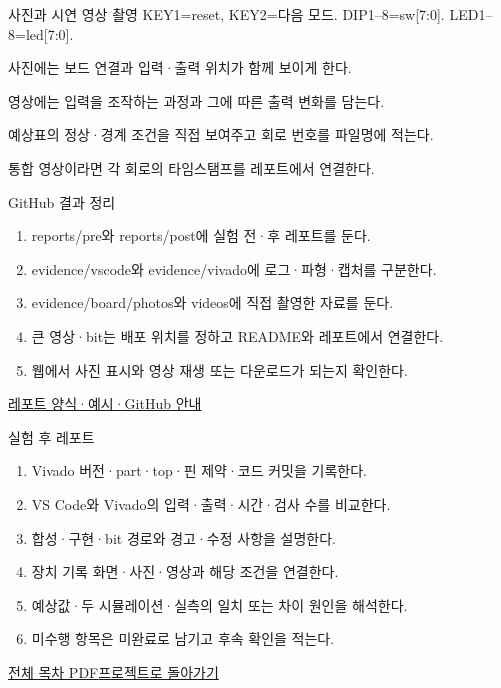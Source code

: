 \begin{frame}{사진과 시연 영상 촬영}\relax
\small
KEY1=reset, KEY2=다음 모드. DIP1–8=sw[7:0]. LED1–8=led[7:0].\par\vspace{0.22cm}사진에는 보드 연결과 입력·출력 위치가 함께 보이게 한다.\par\vspace{0.22cm}영상에는 입력을 조작하는 과정과 그에 따른 출력 변화를 담는다.\par\vspace{0.22cm}예상표의 정상·경계 조건을 직접 보여주고 회로 번호를 파일명에 적는다.\par\vspace{0.22cm}통합 영상이라면 각 회로의 타임스탬프를 레포트에서 연결한다.\par
\end{frame}

\begin{frame}{GitHub 결과 정리}\relax
\small
\begin{enumerate}\setlength{\itemsep}{0.22cm}
\item reports/pre와 reports/post에 실험 전·후 레포트를 둔다.
\item evidence/vscode와 evidence/vivado에 로그·파형·캡처를 구분한다.
\item evidence/board/photos와 videos에 직접 촬영한 자료를 둔다.
\item 큰 영상·bit는 배포 위치를 정하고 README와 레포트에서 연결한다.
\item 웹에서 사진 표시와 영상 재생 또는 다운로드가 되는지 확인한다.
\end{enumerate}
\href{https://github.com/Glaysia/ece2_26_2_2/blob/daily/0910/example/fpga_projects_hdl/LAB1/docs/reports.md}{레포트 양식·예시·GitHub 안내}
\end{frame}

\begin{frame}{실험 후 레포트}\relax
\small
\begin{enumerate}\setlength{\itemsep}{0.22cm}
\item Vivado 버전·part·top·핀 제약·코드 커밋을 기록한다.
\item VS Code와 Vivado의 입력·출력·시간·검사 수를 비교한다.
\item 합성·구현·bit 경로와 경고·수정 사항을 설명한다.
\item 장치 기록 화면·사진·영상과 해당 조건을 연결한다.
\item 예상값·두 시뮬레이션·실측의 일치 또는 차이 원인을 해석한다.
\item 미수행 항목은 미완료로 남기고 후속 확인을 적는다.
\end{enumerate}
\href{04.LAB1_00_CONTENTS.pdf}{전체 목차 PDF}\quad\href{https://github.com/Glaysia/fpga-lab-example-vivado-2026-1-integrated/tree/5a553ee802270caf3f909395f5e29bdcbbd48352}{프로젝트로 돌아가기}
\end{frame}
\endgroup

